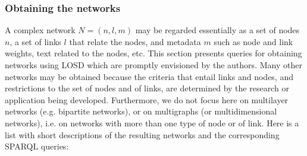 \documentclass[data,datadescriptor,submit,moreauthors,pdftex]{Definitions/mdpi}
\begin{document}
\subsubsection{Obtaining the networks}\label{snet}
A complex network $N=(n,l,m)$ may be regarded essentially as
a set of nodes $n$, a set of links $l$ that relate the nodes,
and metadata $m$ such as node and link weights, text related to the nodes, etc.
This section presents queries for obtaining networks using LOSD
which are promptly envisioned by the authors.
Many other networks may be obtained because the criteria that entail
links and nodes, and restrictions to the set of nodes and of links,
are determined by the research or application being developed.
Furthermore, we do not focus here on multilayer networks (e.g. bipartite networks),
or on multigraphs (or multidimensional networks),
i.e. on networks with more than one type of node or of link.
Here is a list with short descriptions of the resulting networks and the corresponding SPARQL queries:
\end{document}
